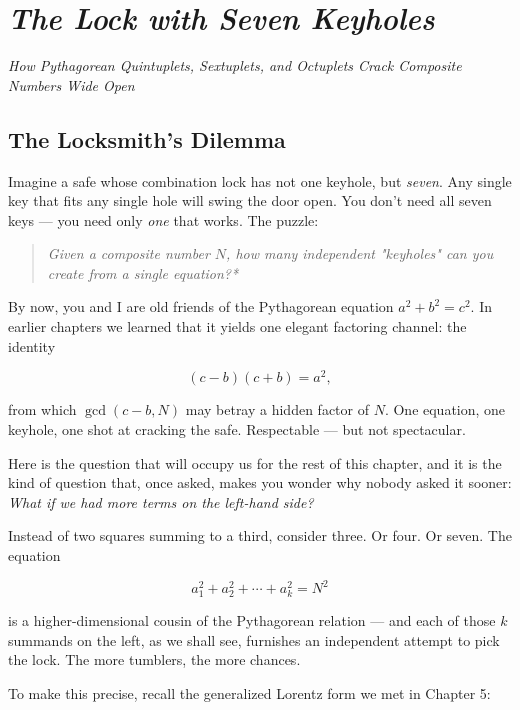 \chapter{\textit{The Lock with Seven Keyholes}}
\begin{center}\large\itshape \textit{How Pythagorean Quintuplets, Sextuplets, and Octuplets Crack Composite Numbers Wide Open}\end{center}
\medskip
\label{ch06}




\bigskip


\section{The Locksmith's Dilemma}

Imagine a safe whose combination lock has not one keyhole, but \textit{seven}. Any single key that fits any single hole will swing the door open. You don't need all seven keys --- you need only \textit{one} that works. The puzzle:

\begin{quote}
\itshape *Given a composite number $N$, how many independent "keyholes" can you create from a single equation?*
\end{quote}

By now, you and I are old friends of the Pythagorean equation $a^2 + b^2 = c^2$. In earlier chapters we learned that it yields one elegant factoring channel: the identity

\[
(c - b)(c + b) = a^2,
\]

from which $\gcd(c - b, N)$ may betray a hidden factor of $N$. One equation, one keyhole, one shot at cracking the safe. Respectable --- but not spectacular.

Here is the question that will occupy us for the rest of this chapter, and it is the kind of question that, once asked, makes you wonder why nobody asked it sooner: \textit{What if we had more terms on the left-hand side?}

Instead of two squares summing to a third, consider three. Or four. Or seven. The equation

\[
a_1^2 + a_2^2 + \cdots + a_k^2 = N^2
\]

is a higher-dimensional cousin of the Pythagorean relation --- and each of those $k$ summands on the left, as we shall see, furnishes an independent attempt to pick the lock. The more tumblers, the more chances.

To make this precise, recall the generalized Lorentz form we met in Chapter 5:

